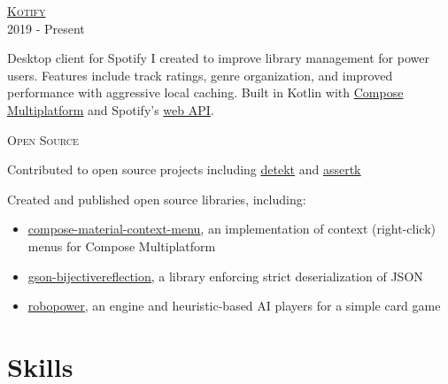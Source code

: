 \documentclass[letterpaper,10pt]{article}
\newenvironment{lcol}
{
    \begin{minipage}[t]{.185\linewidth}
    \begin{flushright}
}
{
    \end{flushright}
    \end{minipage}
}
\newenvironment{rcol}
{
    \begin{minipage}[t]{.8\linewidth}
}
{
    \end{minipage}
}
\begin{document}
\begin{lcol}
    \textsc{\href{https://github.com/dzirbel/kotify}{ Kotify}} \\
    2019 - Present
\end{lcol}
\begin{rcol}
    Desktop client for Spotify I created to improve library management for power users. Features include track ratings, genre organization, and improved performance with aggressive local caching. Built in Kotlin with \href{https://www.jetbrains.com/lp/compose-multiplatform/}{Compose Multiplatform} and Spotify's \href{https://developer.spotify.com/documentation/web-api/}{web API}.
\end{rcol}

\vspace{6pt}

\begin{lcol}
    \textsc{Open Source}
\end{lcol}
\begin{rcol}
    Contributed to open source projects including \href{https://github.com/detekt/detekt/issues?q=author\%3Adzirbel}{\underline{ detekt}} and \href{https://github.com/willowtreeapps/assertk/issues?q=author\%3Adzirbel}{\underline{ assertk}}
    
    \vspace{4pt}

    Created and published open source libraries, including:
    
    \begin{itemize}[itemsep=2pt]
      \item \href{https://github.com/dzirbel/compose-material-context-menu}{ \underline{compose-material-context-menu}}, an implementation of context (right-click) menus for Compose Multiplatform
      \item \href{https://github.com/dzirbel/gson-bijectivereflection}{ \underline{gson-bijectivereflection}}, a library enforcing strict deserialization of JSON
      \item \href{https://github.com/dzirbel/robopower}{ \underline{robopower}}, an engine and heuristic-based AI players for a simple card game
    \end{itemize}
\end{rcol}

\section{Skills}
\end{document}
